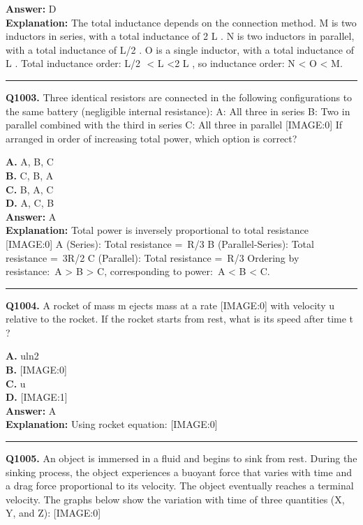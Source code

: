 \documentclass[12pt]{article}
\begin{document}
\textbf{Answer:} D \\
\textbf{Explanation:} The total inductance depends on the connection method.
M is two inductors in series, with a total inductance of 2
L
.
N is two inductors in parallel, with a total inductance of
L/2
​
.
O is a single inductor, with a total inductance of
L
.
Total inductance order:
L/2
​
<
L
<2
L
, so inductance order: N < O < M.

\hrule
\vspace{1em}


\noindent
\textbf{Q1003.} Three identical resistors are connected in the following configurations to the same battery (negligible internal resistance):
A: All three in series
B: Two in parallel combined with the third in series
C: All three in parallel
[IMAGE:0]
If arranged in order of increasing total power, which option is correct?



\textbf{A.} A, B, C \\
\textbf{B.} C, B, A \\
\textbf{C.} B, A, C \\
\textbf{D.} A, C, B \\

\textbf{Answer:} A \\
\textbf{Explanation:} Total power is inversely proportional to total resistance
[IMAGE:0]
A (Series): Total resistance = R/3
B (Parallel-Series): Total resistance = 3R/2
C (Parallel): Total resistance = R/3
Ordering by resistance: A > B > C, corresponding to power: A < B < C.

\hrule
\vspace{1em}


\noindent
\textbf{Q1004.} A rocket of mass
m
ejects mass at a rate
[IMAGE:0]
with velocity
u
relative to the rocket. If the rocket starts from rest, what is its speed after time
t
?



\textbf{A.} uln2 \\
\textbf{B.} [IMAGE:0] \\
\textbf{C.} u \\
\textbf{D.} [IMAGE:1] \\

\textbf{Answer:} A \\
\textbf{Explanation:} Using rocket equation:
[IMAGE:0]

\hrule
\vspace{1em}


\noindent
\textbf{Q1005.} An object is immersed in a fluid and begins to sink from rest. During the sinking process, the object experiences a buoyant force that varies with time and a drag force proportional to its velocity. The object eventually reaches a terminal velocity. The graphs below show the variation with time of three quantities (X, Y, and Z):
[IMAGE:0]
\end{document}
